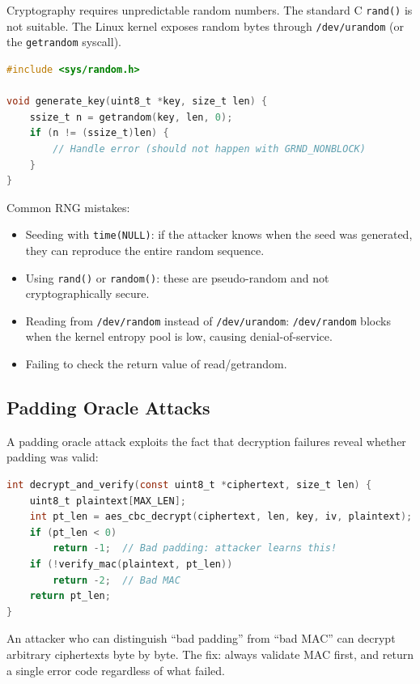 Cryptography requires unpredictable random numbers. The standard C \texttt{rand()} is not suitable. The Linux kernel exposes random bytes through \texttt{/dev/urandom} (or the \texttt{getrandom} syscall).

\begin{lstlisting}[language=C, caption=Reading random bytes on Linux]
#include <sys/random.h>

void generate_key(uint8_t *key, size_t len) {
    ssize_t n = getrandom(key, len, 0);
    if (n != (ssize_t)len) {
        // Handle error (should not happen with GRND_NONBLOCK)
    }
}
\end{lstlisting}

Common RNG mistakes:
\begin{itemize}
	\item Seeding with \texttt{time(NULL)}: if the attacker knows when the seed was generated, they can reproduce the entire random sequence.
	\item Using \texttt{rand()} or \texttt{random()}: these are pseudo-random and not cryptographically secure.
	\item Reading from \texttt{/dev/random} instead of \texttt{/dev/urandom}: \texttt{/dev/random} blocks when the kernel entropy pool is low, causing denial-of-service.
	\item Failing to check the return value of read/getrandom.
\end{itemize}

\subsection{Padding Oracle Attacks}

A padding oracle attack exploits the fact that decryption failures reveal whether padding was valid:

\begin{lstlisting}[language=C, caption=AES-CBC padding oracle]
int decrypt_and_verify(const uint8_t *ciphertext, size_t len) {
    uint8_t plaintext[MAX_LEN];
    int pt_len = aes_cbc_decrypt(ciphertext, len, key, iv, plaintext);
    if (pt_len < 0)
        return -1;  // Bad padding: attacker learns this!
    if (!verify_mac(plaintext, pt_len))
        return -2;  // Bad MAC
    return pt_len;
}
\end{lstlisting}

An attacker who can distinguish ``bad padding'' from ``bad MAC'' can decrypt arbitrary ciphertexts byte by byte. The fix: always validate MAC first, and return a single error code regardless of what failed.

